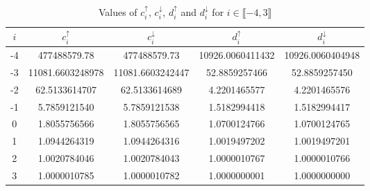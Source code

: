 \documentclass[letterpaper,11pt,oneside,reqno]{amsbook}
\numberwithin{figure}{chapter}
\theoremstyle{definition}
\theoremstyle{definition}
\theoremstyle{definition}
\theoremstyle{definition}
\theoremstyle{definition}
\begin{document}
 \begin{table}
 \begin{center}
 \begin{tabular}{| c | c | c | c | c |}
 \hline
 $i$ & $c_i^\uparrow$ & $c_i^\downarrow$ & $d_i^\uparrow$ & $d_i^\downarrow$ \\
 \hline
  -4 & 477488579.78   & 477488579.73  & 10926.0060411432 & 10926.0060404948 \\ 
 -3 & 11081.6603248978 & 11081.6603242447 & 52.8859257466 & 52.8859257450 \\
 -2 & 62.5133614707 & 62.5133614689 & 4.2201465577 & 4.2201465576 \\
 -1 & 5.7859121540 & 5.7859121538 & 1.5182994418 & 1.5182994417 \\
0 & 1.8055756566 & 1.8055756565 & 1.0700124766 & 1.0700124765 \\
1 & 1.0944264319 & 1.0944264316 & 1.0019497202 & 1.0019497201 \\
2 & 1.0020784046 & 1.0020784043 & 1.0000010767 & 1.0000010766 \\
3 & 1.0000010785 & 1.0000010782 & 1.0000000001 & 1.0000000000  \\
 \hline
 \end{tabular}
 \caption{Values of  $c_i^\uparrow$, $c_i^\downarrow$, $d_i^\uparrow$ and $d_i^\downarrow$  for $i \in \llbracket -4,3 \rrbracket$}\label{t.two}
 \end{center}
 \end{table}


  
  
\end{document}
